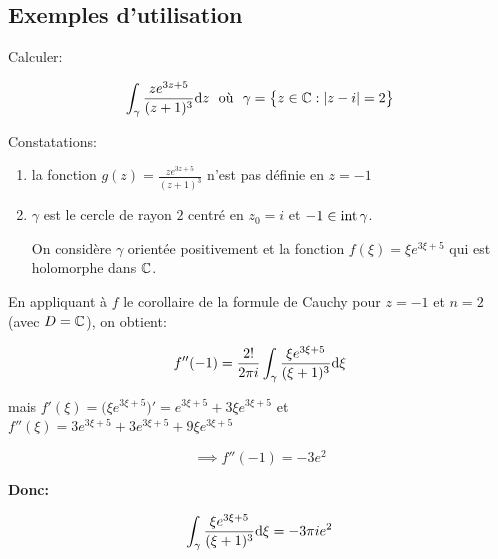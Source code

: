 \subsection{Exemples d'utilisation}

\begin{example}[1]
    Calculer:
    
    \[
    \int_\gamma \frac{z e^{3z + 5}}{(z + 1)^3}\mathrm{d}z \ \textrm{ où }\ \gamma = \big\{z \in \mathbb{C} : \left|z - i\right| = 2\big\}
    \]
    
    Constatations:
    
    \begin{enumerate}[label=\arabic{enumi})]
    \item 
    la fonction $g(z) = \frac{z e^{3z + 5}}{(z + 1)^3}$ n'est pas définie en $z = -1$
    
    \item 
    $\gamma$ est le cercle de rayon $2$ centré en $z_0 = i$ et $-1 \in \textrm{int}\, \gamma$.
    
    On considère $\gamma$ orientée positivement et la fonction $f(\xi) = \xi e^{3\xi + 5}$ qui est holomorphe dans $\mathbb{C}$.
    \end{enumerate}

    En appliquant à $f$ le corollaire de la formule de Cauchy pour $z = -1$ et $n = 2$ (avec $D = \mathbb{C}$), on obtient:
    
    \[f''(-1) = \frac{2!}{2\pi i} \int_\gamma \frac{\xi e^{3\xi + 5}}{(\xi + 1)^3} \mathrm{d}\xi\]
    
    mais $f'(\xi) = \big(\xi e^{3\xi + 5}\big)' = e^{3\xi + 5} + 3 \xi e^{3\xi + 5}$ et $f''(\xi) = 3 e^{3\xi + 5} + 3 e^{3\xi + 5} + 9 \xi e^{3\xi + 5}$
    
    \[ \implies f''(-1) = -3 e^2 \]
    
    \textbf{Donc:}
    
    \[
    \int_\gamma \frac{\xi e^{3\xi + 5}}{(\xi + 1)^3} \mathrm{d}\xi
    = -3\pi i e^2
    \]
\end{example}

